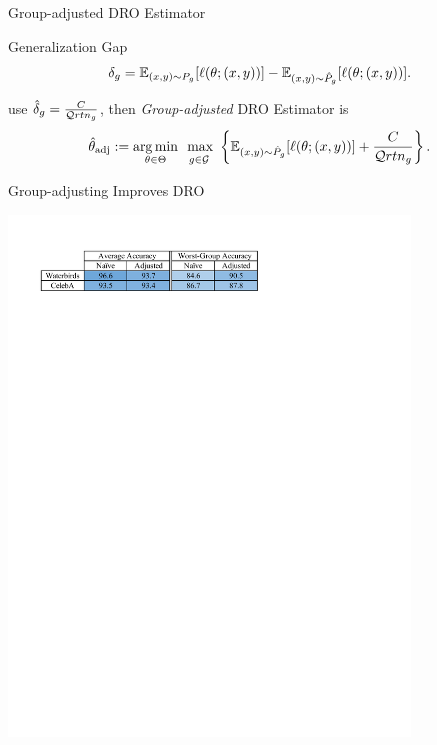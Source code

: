 \documentclass{beamer}
\begin{document}
\begin{viterbiframe}{Group-adjusted DRO Estimator}
    
    Generalization Gap \[\delta_{g} = \mathbb{E}_{(x,y) \sim P_g}[\ell(\theta; (x,y))] - \mathbb{E}_{(x,y) \sim {\hat{P}}_g}[\ell(\theta; (x,y))].\]
    
    use $\hat{\delta}_{g}=\frac{C}{\mathcal{Q}rt{n_g}}$, then \emph{Group-adjusted} DRO Estimator is
    \begin{align}\label{eqn:htadj}
        \htadj \eqdef \argmin_{\theta \in \Theta} \ \underset{g \in \mathcal{G}}{\vphantom{\argmin}\max} \ \left\{ \E_{(x, y) \sim \hP_g}[\ell(\theta; (x, y))] + \frac{C}{\mathcal{Q}rt{n_g}}\right\}.
    \end{align}
\end{viterbiframe}

\begin{viterbiframe}{Group-adjusting Improves DRO}
    
    \begin{table}
    \includegraphics[width=0.8\textwidth]{img/table_2.pdf}
    \end{table}


\end{viterbiframe}
\end{document}
